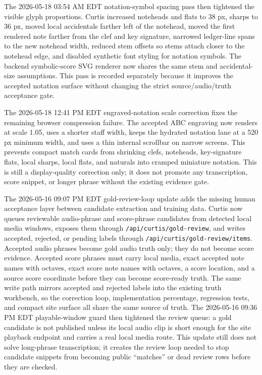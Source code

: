 \documentclass[12pt,letterpaper]{article}
\begin{document}
The 2026-05-18 03:54 AM EDT notation-symbol spacing pass then tightened the visible glyph proportions. Curtis increased noteheads and flats to 38 px, sharps to 36 px, moved local accidentals farther left of the notehead, moved the first rendered note farther from the clef and key signature, narrowed ledger-line spans to the new notehead width, reduced stem offsets so stems attach closer to the notehead edge, and disabled synthetic font styling for notation symbols. The backend symbolic-score SVG renderer now shares the same stem and accidental-size assumptions. This pass is recorded separately because it improves the accepted notation surface without changing the strict source/audio/truth acceptance gate.

The 2026-05-18 12:41 PM EDT engraved-notation scale correction fixes the remaining browser compression failure. The accepted ABC engraving now renders at scale 1.05, uses a shorter staff width, keeps the hydrated notation lane at a 520 px minimum width, and uses a thin internal scrollbar on narrow screens. This prevents compact match cards from shrinking clefs, noteheads, key-signature flats, local sharps, local flats, and naturals into cramped miniature notation. This is still a display-quality correction only; it does not promote any transcription, score snippet, or longer phrase without the existing evidence gate.

The 2026-05-16 09:07 PM EDT gold-review-loop update adds the missing human acceptance layer between candidate extraction and training data. Curtis now queues reviewable audio-phrase and score-phrase candidates from detected local media windows, exposes them through \texttt{/api/curtis/gold-review}, and writes accepted, rejected, or pending labels through \texttt{/api/curtis/gold-review/items}. Accepted audio phrases become gold audio truth only; they do not become score evidence. Accepted score phrases must carry local media, exact accepted note names with octaves, exact score note names with octaves, a score location, and a source score coordinate before they can become score-ready truth. The same write path mirrors accepted and rejected labels into the existing truth workbench, so the correction loop, implementation percentage, regression tests, and compact site surface all share the same source of truth. The 2026-05-16 09:36 PM EDT playable-window guard then tightened the review queue: a gold candidate is not published unless its local audio clip is short enough for the site playback endpoint and carries a real local media route. This update still does not solve long-phrase transcription; it creates the review loop needed to stop candidate snippets from becoming public ``matches'' or dead review rows before they are checked.
\end{document}
